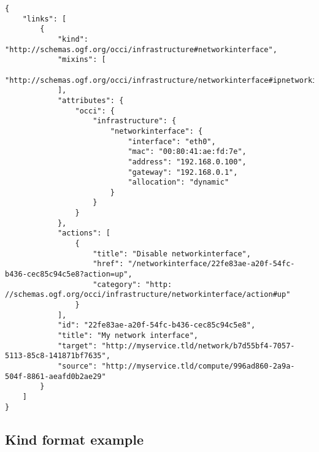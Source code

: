 \documentclass[10pt,a4paper]{article}
\begin{document}
\begin{verbatim}
{
    "links": [
        {
            "kind": "http://schemas.ogf.org/occi/infrastructure#networkinterface",
            "mixins": [
                "http://schemas.ogf.org/occi/infrastructure/networkinterface#ipnetworkinterface"
            ],
            "attributes": {
                "occi": {
                    "infrastructure": {
                        "networkinterface": {
                            "interface": "eth0",
                            "mac": "00:80:41:ae:fd:7e",
                            "address": "192.168.0.100",
                            "gateway": "192.168.0.1",
                            "allocation": "dynamic"
                        }
                    }
                }
            },
            "actions": [
                {
                    "title": "Disable networkinterface",
                    "href": "/networkinterface/22fe83ae-a20f-54fc-b436-cec85c94c5e8?action=up",
                    "category": "http: //schemas.ogf.org/occi/infrastructure/networkinterface/action#up"
                }
            ],
            "id": "22fe83ae-a20f-54fc-b436-cec85c94c5e8",
		    "title": "My network interface",
            "target": "http://myservice.tld/network/b7d55bf4-7057-5113-85c8-141871bf7635",
            "source": "http://myservice.tld/compute/996ad860-2a9a-504f-8861-aeafd0b2ae29"
        }
    ]
}
\end{verbatim}

\subsection{Kind format example}
\label{sec:example_kind}
\end{document}
